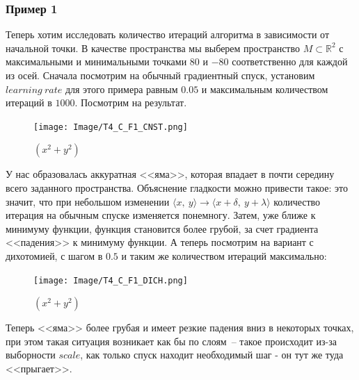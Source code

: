 \documentclass[12pt, a4paper, oneside, final]{article}
\begin{document}
	\subsubsection*{Пример 1}
	Теперь хотим исследовать количество итераций алгоритма в зависимости от начальной точки. В качестве пространства мы выберем пространство $M \subset \mathbb{R}^{2}$ с максимальными и минимальными точками $80$ и $-80$ соответственно для каждой из осей. Сначала посмотрим на обычный градиентный спуск, установим $learning~rate$ для этого примера равным $0.05$ и максимальным количеством итераций в $1000$. Посмотрим на результат.
	\begin{figure}[H]
		\centering
		\texttt{[image: Image/T4\_C\_F1\_CNST.png]}
		\caption{$(x^{2} + y^{2})$}
	\end{figure}
	У нас образовалась аккуратная <<яма>>, которая впадает в почти середину всего заданного пространства. Объяснение гладкости можно привести такое: это значит, что при небольшом изменении $\langle x, ~ y\rangle \to \langle x + \delta, ~ y + \lambda \rangle$ количество итерация на обычным спуске изменяется понемногу. Затем, уже ближе к минимуму функции, функция становится более грубой, за счет градиента <<падения>> к минимуму функции. А теперь посмотрим на вариант с дихотомией, с шагом в $0.5$ и таким же количеством итераций максимально:
	\begin{figure}[H]
		\centering
		\texttt{[image: Image/T4\_C\_F1\_DICH.png]}
		\caption{$(x^{2} + y^{2})$}
	\end{figure}
	Теперь <<яма>> более грубая и имеет резкие падения вниз в некоторых точках, при этом такая ситуация возникает как бы по слоям~-- такое происходит из-за выборности $scale$, как только спуск находит необходимый шаг - он тут же туда <<прыгает>>.
\end{document}
